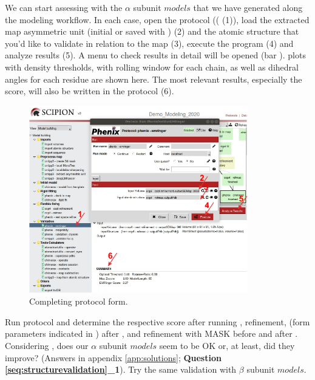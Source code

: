   
 We can start assessing with \emringer the  $\alpha$ subunit $models$ that we have generated along the modeling workflow. In each case, open the  protocol (( (1)), load the extracted map asymmetric unit (initial or saved with \coot) (2) and the atomic structure that you'd like to validate in relation to the map (3), execute the program (4) and analyze results (5). A menu to check results in detail will be opened (bar ).  plots with density thresholds, with rolling window for each chain, as well as dihedral angles for each residue are shown here. The most relevant results, especially the \emringer score, will also be written in the protocol  (6). 
 
  \begin{figure}[H]
  \centering 
  \captionsetup{width=.7\linewidth} 
  \includegraphics[width=0.85\textwidth]{Images/Fig34}
  \caption{Completing \emringer protocol form.}
  \label{fig:emringer_protocol}
  \end{figure}
 
 Run \emringer protocol and determine the respective score after running \chimera {}, \coot refinement, \phenix {} (form parameters indicated in ) after \coot, and  refinement with MASK before and after \phenix {}. Considering \emringer {}, does our  $\alpha$ subunit $models$ seem to be OK or, at least, did they improve? (Answers in appendix \ref{app:solutions}; \textbf{Question \ref{seq:structurevalidation}\_1}). Try the same validation with $\beta$ subunit $models$. \\
 
